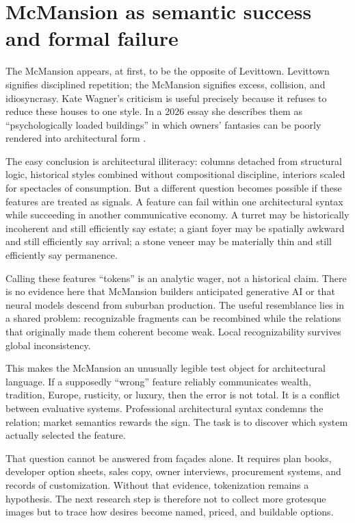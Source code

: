 \documentclass[11pt]{article}
\begin{document}
\section{McMansion as semantic success and formal failure}
The McMansion appears, at first, to be the opposite of Levittown. Levittown signifies disciplined repetition; the McMansion signifies excess, collision, and idiosyncrasy. Kate Wagner's criticism is useful precisely because it refuses to reduce these houses to one style. In a 2026 essay she describes them as ``psychologically loaded buildings'' in which owners' fantasies can be poorly rendered into architectural form \citep{wagner2026mcmodernslopcore}.

The easy conclusion is architectural illiteracy: columns detached from structural logic, historical styles combined without compositional discipline, interiors scaled for spectacles of consumption. But a different question becomes possible if these features are treated as signals. A feature can fail within one architectural syntax while succeeding in another communicative economy. A turret may be historically incoherent and still efficiently say estate; a giant foyer may be spatially awkward and still efficiently say arrival; a stone veneer may be materially thin and still efficiently say permanence.

Calling these features ``tokens'' is an analytic wager, not a historical claim. There is no evidence here that McMansion builders anticipated generative AI or that neural models descend from suburban production. The useful resemblance lies in a shared problem: recognizable fragments can be recombined while the relations that originally made them coherent become weak. Local recognizability survives global inconsistency.

This makes the McMansion an unusually legible test object for architectural language. If a supposedly ``wrong'' feature reliably communicates wealth, tradition, Europe, rusticity, or luxury, then the error is not total. It is a conflict between evaluative systems. Professional architectural syntax condemns the relation; market semantics rewards the sign. The task is to discover which system actually selected the feature.

That question cannot be answered from façades alone. It requires plan books, developer option sheets, sales copy, owner interviews, procurement systems, and records of customization. Without that evidence, tokenization remains a hypothesis. The next research step is therefore not to collect more grotesque images but to trace how desires become named, priced, and buildable options.
\end{document}
